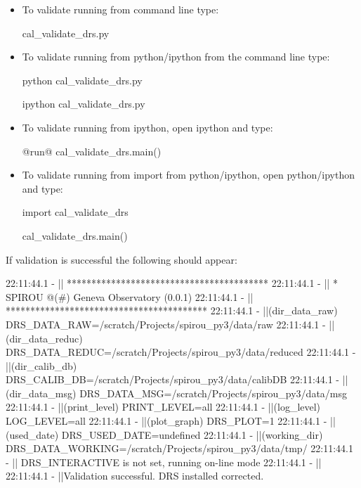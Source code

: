 \begin{itemize}

\item To validate running from command line type:
\begin{cmdbox}
cal_validate_drs.py
\end{cmdbox}

\item To validate running from python/ipython from the command line type:
\begin{cmdbox}
python cal_validate_drs.py

ipython cal_validate_drs.py
\end{cmdbox}

\item To validate running from ipython, open ipython and type:
\begin{pythonbox}
@run@ cal_validate_drs.main()
\end{pythonbox}

\item To validate running from import from python/ipython, open python/ipython and type:
\begin{pythonbox}
import cal_validate_drs

cal_validate_drs.main()
\end{pythonbox}

\end{itemize}

\noindent If validation is successful the following should appear:

\begin{cmdbox}
22:11:44.1 -   || *****************************************
22:11:44.1 -   || * SPIROU @(#) Geneva Observatory (0.0.1)
22:11:44.1 -   || *****************************************
22:11:44.1 -   ||(dir_data_raw)      DRS_DATA_RAW=/scratch/Projects/spirou_py3/data/raw
22:11:44.1 -   ||(dir_data_reduc)    DRS_DATA_REDUC=/scratch/Projects/spirou_py3/data/reduced
22:11:44.1 -   ||(dir_calib_db)      DRS_CALIB_DB=/scratch/Projects/spirou_py3/data/calibDB
22:11:44.1 -   ||(dir_data_msg)      DRS_DATA_MSG=/scratch/Projects/spirou_py3/data/msg
22:11:44.1 -   ||(print_level)       PRINT_LEVEL=all         %
22:11:44.1 -   ||(log_level)         LOG_LEVEL=all         %
22:11:44.1 -   ||(plot_graph)        DRS_PLOT=1            %
22:11:44.1 -   ||(used_date)         DRS_USED_DATE=undefined
22:11:44.1 -   ||(working_dir)       DRS_DATA_WORKING=/scratch/Projects/spirou_py3/data/tmp/
22:11:44.1 -   ||                    DRS_INTERACTIVE is not set, running on-line mode
22:11:44.1 -   ||
22:11:44.1 -   ||Validation successful. DRS installed corrected.
\end{cmdbox}

